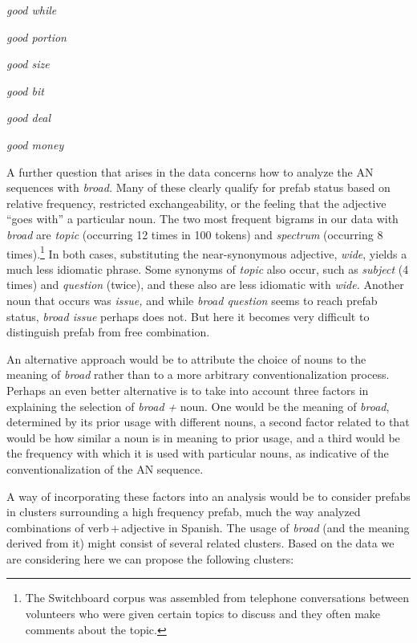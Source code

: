 \documentclass[output=paper]{langscibook}
\begin{document}
\ea\label{ex:bybee:7}
\textit{good while}

\textit{good portion}

\textit{good size}

\textit{good bit}

\textit{good deal}

    \textit{good money}

\z

A further question that arises in the data concerns how to analyze the AN sequences with \textit{broad.} Many of these clearly qualify for prefab status based on relative frequency, restricted exchangeability, or the feeling that the adjective ``goes with'' a particular noun. The two most frequent bigrams in our data with \textit{broad} are \textit{topic} (occurring 12 times in 100 tokens) and \textit{spectrum} (occurring 8 times).\footnote{The Switchboard corpus was assembled from telephone conversations between volunteers who were given certain topics to discuss and they often make comments about the topic.} In both cases, substituting the near-synonymous adjective, \textit{wide}, yields a much less idiomatic phrase. Some synonyms of \textit{topic} also occur, such as \textit{subject} (4 times) and \textit{question} (twice), and these also are less idiomatic with \textit{wide.} Another noun that occurs was \textit{issue,} and while \textit{broad question} seems to reach prefab status, \textit{broad issue} perhaps does not. But here it becomes very difficult to distinguish prefab from free combination. 

An alternative approach would be to attribute the choice of nouns to the meaning of \textit{broad} rather than to a more arbitrary conventionalization process. Perhaps an even better alternative is to take into account three factors in explaining the selection of \textit{broad} \textit{+} noun. One would be the meaning of \textit{broad}, determined by its prior usage with different nouns, a second factor related to that would be how similar a noun is in meaning to prior usage, and a third would be the frequency with which it is used with particular nouns, as indicative of the conventionalization of the AN sequence.

A way of incorporating these factors into an analysis would be to consider prefabs in clusters surrounding a high frequency prefab, much the way \citet{BybeeEddington2006} analyzed combinations of verb\,+\,adjective in Spanish. The usage of \textit{broad} (and the meaning derived from it) might consist of several related clusters. Based on the data we are considering here we can propose the following clusters:
\end{document}
